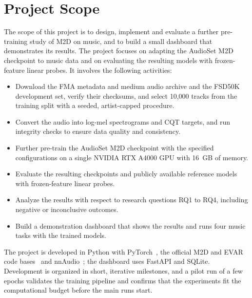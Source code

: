 \documentclass{FastFyp}
\begin{document}
\section{Project Scope}
\label{sec:vision-scope}
The scope of this project is to design, implement and evaluate a further pre-training study of M2D on music, and to build a small dashboard that demonstrates its results. The project focuses on adapting the AudioSet M2D checkpoint to music data and on evaluating the resulting models with frozen-feature linear probes. It involves the following activities:
\begin{itemize}
  \item Download the FMA metadata and medium audio archive and the FSD50K development set, verify their checksums, and select 10,000 tracks from the training split with a seeded, artist-capped procedure.
  \item Convert the audio into log-mel spectrograms and CQT targets, and run integrity checks to ensure data quality and consistency.
  \item Further pre-train the AudioSet M2D checkpoint with the specified configurations on a single NVIDIA RTX A4000 GPU with 16~GB of memory.
  \item Evaluate the resulting checkpoints and publicly available reference models with frozen-feature linear probes.
  \item Analyze the results with respect to research questions RQ1 to RQ4, including negative or inconclusive outcomes.
  \item Build a demonstration dashboard that shows the results and runs four music tasks with the trained models.
\end{itemize}
The project is developed in Python with PyTorch~\cite{ref:Paszke:2019pytorch}, the official M2D and EVAR code bases~\cite{ref:M2DGit,ref:EVARGit} and nnAudio~\cite{ref:Cheuk:2020nnaudio}; the dashboard uses FastAPI and SQLite. Development is organized in short, iterative milestones, and a pilot run of a few epochs validates the training pipeline and confirms that the experiments fit the computational budget before the main runs start.
\end{document}
